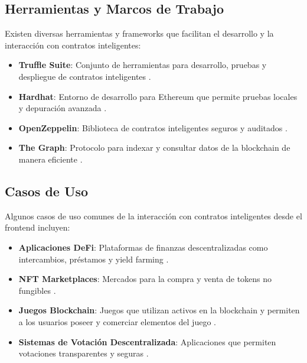 \subsection{Herramientas y Marcos de Trabajo}

Existen diversas herramientas y frameworks que facilitan el desarrollo y la interacción con contratos inteligentes:

\begin{itemize}
    \item \textbf{Truffle Suite}: Conjunto de herramientas para desarrollo, pruebas y despliegue de contratos inteligentes \cite{truffle}.

    \item \textbf{Hardhat}: Entorno de desarrollo para Ethereum que permite pruebas locales y depuración avanzada \cite{hardhat}.

    \item \textbf{OpenZeppelin}: Biblioteca de contratos inteligentes seguros y auditados \cite{openzeppelin}.

    \item \textbf{The Graph}: Protocolo para indexar y consultar datos de la blockchain de manera eficiente \cite{thegraph}.

\end{itemize}

\subsection{Casos de Uso}

Algunos casos de uso comunes de la interacción con contratos inteligentes desde el frontend incluyen:

\begin{itemize}
    \item \textbf{Aplicaciones DeFi}: Plataformas de finanzas descentralizadas como intercambios, préstamos y yield farming \cite{werner2021sok}.

    \item \textbf{NFT Marketplaces}: Mercados para la compra y venta de tokens no fungibles \cite{wang2021non}.

    \item \textbf{Juegos Blockchain}: Juegos que utilizan activos en la blockchain y permiten a los usuarios poseer y comerciar elementos del juego \cite{nfts2020}.

    \item \textbf{Sistemas de Votación Descentralizada}: Aplicaciones que permiten votaciones transparentes y seguras \cite{zhang2019survey}.

\end{itemize}

